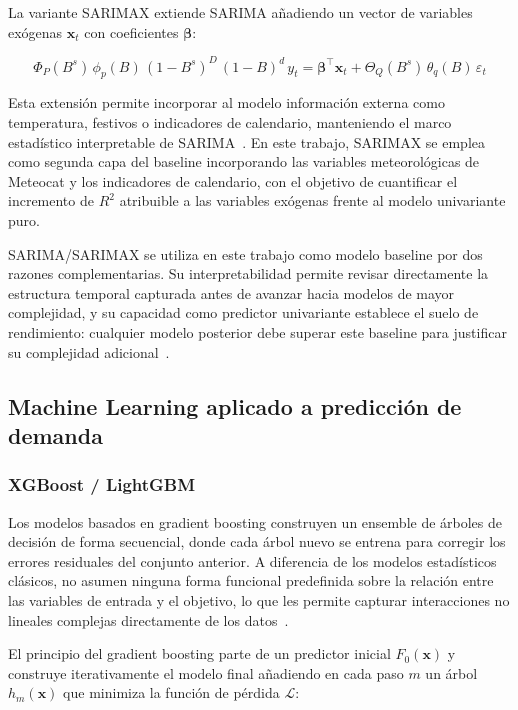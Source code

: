 \documentclass[12pt, a4paper]{article}
\begin{document}
La variante SARIMAX extiende SARIMA añadiendo un vector de variables exógenas $\mathbf{x}_t$ con coeficientes $\boldsymbol{\beta}$:

\begin{equation}
\Phi_P(B^s)\,\phi_p(B)\,(1-B^s)^D\,(1-B)^d\, y_t = \boldsymbol{\beta}^\top \mathbf{x}_t + \Theta_Q(B^s)\,\theta_q(B)\,\varepsilon_t
\end{equation}

Esta extensión permite incorporar al modelo información externa como temperatura, festivos o indicadores de calendario, manteniendo el marco estadístico interpretable de SARIMA~\cite{hyndman2021}. En este trabajo, SARIMAX se emplea como segunda capa del baseline incorporando las variables meteorológicas de Meteocat y los indicadores de calendario, con el objetivo de cuantificar el incremento de $R^2$ atribuible a las variables exógenas frente al modelo univariante puro.

SARIMA/SARIMAX se utiliza en este trabajo como modelo baseline por dos razones complementarias. Su interpretabilidad permite revisar directamente la estructura temporal capturada antes de avanzar hacia modelos de mayor complejidad, y su capacidad como predictor univariante establece el suelo de rendimiento: cualquier modelo posterior debe superar este baseline para justificar su complejidad adicional~\cite{hyndman2021, boxjenkins2015}.

\subsection{Machine Learning aplicado a predicción de demanda}

\subsubsection{XGBoost / LightGBM}

Los modelos basados en gradient boosting construyen un ensemble de árboles de decisión de forma secuencial, donde cada árbol nuevo se entrena para corregir los errores residuales del conjunto anterior. A diferencia de los modelos estadísticos clásicos, no asumen ninguna forma funcional predefinida sobre la relación entre las variables de entrada y el objetivo, lo que les permite capturar interacciones no lineales complejas directamente de los datos~\cite{chen2016, ke2017}.

El principio del gradient boosting parte de un predictor inicial $F_0(\mathbf{x})$ y construye iterativamente el modelo final añadiendo en cada paso $m$ un árbol $h_m(\mathbf{x})$ que minimiza la función de pérdida $\mathcal{L}$:
\end{document}
